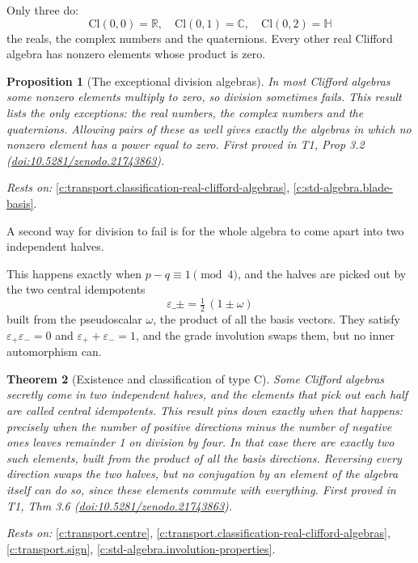 \documentclass[11pt]{article}
\newtheorem{theorem}{Theorem}[section]
\newtheorem{proposition}[theorem]{Proposition}
\theoremstyle{definition}
\theoremstyle{plain}
\providecommand{\C}{}\renewcommand{\C}{\mathbb{C}}
\providecommand{\Cl}{}\renewcommand{\Cl}{\mathrm{Cl}}
\providecommand{\HH}{}\renewcommand{\HH}{\mathbb{H}}
\providecommand{\R}{}\renewcommand{\R}{\mathbb{R}}
\begin{document}
Only three do: \[ \Cl(0,0) = \R, \quad \Cl(0,1) = \C, \quad \Cl(0,2) = \HH \] the reals, the complex numbers and the quaternions. Every other real Clifford algebra has nonzero elements whose product is zero.

\begin{proposition}[The exceptional division algebras]\label{c:transport.exceptional-division-algebras}
In most Clifford algebras some nonzero elements multiply to zero, so division sometimes fails. This result lists the only exceptions: the real numbers, the complex numbers and the quaternions. Allowing pairs of these as well gives exactly the algebras in which no nonzero element has a power equal to zero.
\emph{First proved in} T1, Prop 3.2 (\href{https://doi.org/10.5281/zenodo.21743863}{doi:10.5281/zenodo.21743863}).
\end{proposition}
\noindent\emph{Rests on:} \ref{c:transport.classification-real-clifford-algebras}, \ref{c:std-algebra.blade-basis}.

A second way for division to fail is for the whole algebra to come apart into two independent halves.

This happens exactly when $p - q \equiv 1 \pmod 4$, and the halves are picked out by the two central idempotents \[ \varepsilon\_\pm = \tfrac12\,(1 \pm \omega) \] built from the pseudoscalar $\omega$, the product of all the basis vectors. They satisfy $\varepsilon_+ \varepsilon_- = 0$ and $\varepsilon_+ + \varepsilon_- = 1$, and the grade involution swaps them, but no inner automorphism can.

\begin{theorem}[Existence and classification of type C]\label{c:transport.existence-classification-type-c}
Some Clifford algebras secretly come in two independent halves, and the elements that pick out each half are called central idempotents. This result pins down exactly when that happens: precisely when the number of positive directions minus the number of negative ones leaves remainder 1 on division by four. In that case there are exactly two such elements, built from the product of all the basis directions. Reversing every direction swaps the two halves, but no conjugation by an element of the algebra itself can do so, since these elements commute with everything.
\emph{First proved in} T1, Thm 3.6 (\href{https://doi.org/10.5281/zenodo.21743863}{doi:10.5281/zenodo.21743863}).
\end{theorem}
\noindent\emph{Rests on:} \ref{c:transport.centre}, \ref{c:transport.classification-real-clifford-algebras}, \ref{c:transport.sign}, \ref{c:std-algebra.involution-properties}.
\end{document}

